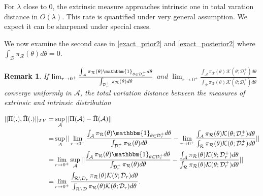 \documentclass[10pt]{article}
\newtheorem{remark}{Remark}
\newcommand{\mc}[1]{\mathcal{#1}}
\DeclareMathOperator{\1}{\mathbbm{1}}
\begin{document}
For $\lambda$ close to $0$, the extrinsic measure approaches intrinsic one in total varation distance in $O(\lambda)$. This rate is quantified under very general assumption. We expect it can be sharpened under special cases.

We now examine the second case in \eqref{exact_prior2} and \eqref{exact_posterior2} where ${ \int_{\mc D} \pi_{\mc R}(\theta)d\theta }=0$.


\begin{remark}
If $\lim_{r\rightarrow 0^+} \frac{\int_{\mc A} \pi_{\mc R}(\theta) \mathbbm{1}_{\theta\in \mc D_r^+} d\theta}{ \int_{\mc D_r^+} \pi_{\mc R}(\theta)d\theta }$ and $ \lim_{r\rightarrow 0^+}\frac{\int_{\mc A} \pi_{\mc R}(\theta) \mc K({\theta; \mc D_r^+}) d\theta}{ \int_{\mc R} \pi_{\mc R}(\theta)  \mc K({\theta; \mc D_r^+}) d\theta }  $ converge uniformly in $\mc A$, the total variation distance between the measures of extrinsic and intrinsic distribution

\begin{equation}
	\begin{aligned}
	||\Pi(.), \tilde{\Pi}(.) ||_{TV}
	= &\sup_{\mc A} ||\Pi(\mc A)- \tilde{\Pi}(\mc A)||\\
	= & \sup_{\mc A}|| \lim_{r\rightarrow 0^+} \frac{\int_{\mc A} \pi_{\mc R}(\theta) \mathbbm{1}_{\theta\in \mc D_r^+} d\theta}{ \int_{\mc D_r^+} \pi_{\mc R}(\theta)d\theta }-  \lim_{r\rightarrow 0^+}\frac{\int_{\mc A} \pi_{\mc R}(\theta) \mc K({\theta; \mc D_r^+}) d\theta}{ \int_{\mc R} \pi_{\mc R}(\theta)  \mc K({\theta; \mc D_r^+}) d\theta } || \\
	= & \lim_{r\rightarrow 0^+} \sup_{\mc A}|| \frac{\int_{\mc A} \pi_{\mc R}(\theta) \mathbbm{1}_{\theta\in \mc D_r^+} d\theta}{ \int_{\mc D_r^+} \pi_{\mc R}(\theta)d\theta }-  \frac{\int_{\mc A} \pi_{\mc R}(\theta) \mc K({\theta; \mc D_r^+}) d\theta}{ \int_{\mc R} \pi_{\mc R}(\theta)  \mc K({\theta; \mc D_r^+}) d\theta } || \\
	=& \lim_{r\rightarrow 0^+}  \frac{\int_{\mc R \setminus \mc \mc D_r} \pi_{\mc R}(\theta) \mc K(\theta;\mc D_r)d\theta}{\int_{\mc R \setminus \mc D} \pi_{\mc R}(\theta) \mc K(\theta;\mc D_r)d\theta}.
	\end{aligned}
\end{equation}
\end{remark}
\end{document}
